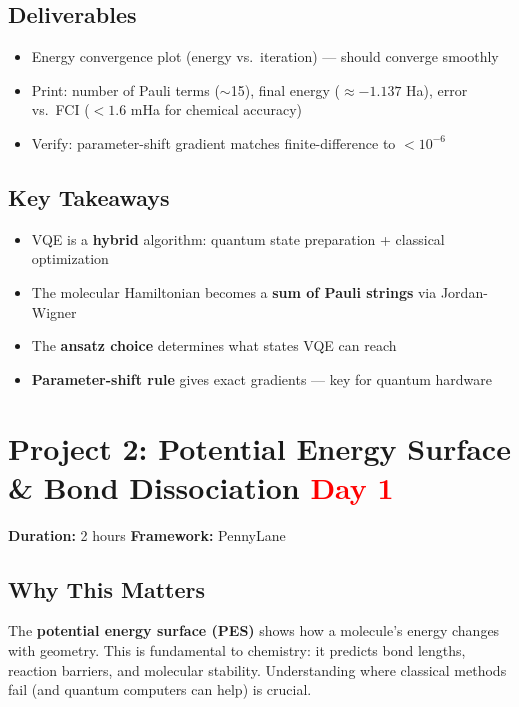 \documentclass[11pt,a4paper]{article}
\begin{document}
\subsection*{Deliverables}
\begin{itemize}
    \item[\checkmark] Energy convergence plot (energy vs.\ iteration) --- should converge smoothly
    \item[\checkmark] Print: number of Pauli terms ($\sim$15), final energy ($\approx -1.137$ Ha), error vs.\ FCI ($<1.6$ mHa for chemical accuracy)
    \item[\checkmark] Verify: parameter-shift gradient matches finite-difference to $<10^{-6}$
\end{itemize}

\subsection*{Key Takeaways}
\begin{itemize}
    \item VQE is a \textbf{hybrid} algorithm: quantum state preparation + classical optimization
    \item The molecular Hamiltonian becomes a \textbf{sum of Pauli strings} via Jordan-Wigner
    \item The \textbf{ansatz choice} determines what states VQE can reach
    \item \textbf{Parameter-shift rule} gives exact gradients --- key for quantum hardware
\end{itemize}


\section{Project 2: Potential Energy Surface \& Bond Dissociation \hfill \textcolor{red}{\textbf{Day 1}}}

\begin{questionbox}
\textbf{Duration:} 2 hours \quad \textbf{Framework:} PennyLane
\end{questionbox}

\subsection*{Why This Matters}
The \textbf{potential energy surface (PES)} shows how a molecule's energy changes with geometry. This is fundamental to chemistry: it predicts bond lengths, reaction barriers, and molecular stability. Understanding where classical methods fail (and quantum computers can help) is crucial.
\end{document}
